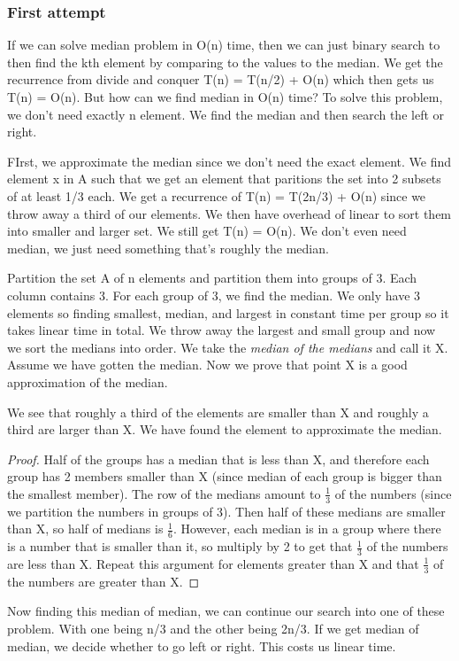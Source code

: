 \documentclass[11pt, oneside]{article}
\theoremstyle{definition}
\begin{document}
\subsubsection{First attempt}
If we can solve median problem in O(n) time, then we can just binary search to then find the kth element by comparing to the values to the median. We get the recurrence from divide and conquer T(n) = T(n/2) + O(n) which then gets us T(n) = O(n). But how can we find median in O(n) time? To solve this problem, we don't need exactly n element. We find the median and then search the left or right.

FIrst, we approximate the median since we don't need the exact element. We find element x in A such that we get an element that paritions the set into 2 subsets of at least 1/3 each. We get a recurrence of T(n) = T(2n/3) + O(n) since we throw away a third of our elements. We then have overhead of linear to sort them into smaller and larger set. We still get T(n) = O(n). We don't even need median, we just need something that's roughly the median.

Partition the set A of n elements and partition them into groups of 3. Each column contains 3. For each group of 3, we find the median. We only have 3 elements so finding smallest, median, and largest in constant time per group so it takes linear time in total. We throw away the largest and small group and now we sort the medians into order. We take the \textit{median of the medians} and call it X. Assume we have gotten the median. Now we prove that point X is a good approximation of the median.

We see that roughly a third of the elements are smaller than X and roughly a third are larger than X. We have found the element to approximate the median.
\begin{proof}
  Half of the groups has a median that is less than X, and therefore each group has 2 members smaller than X (since median of each group is bigger than the smallest member). The row of the medians amount to $\frac{1}{3}$ of the numbers (since we partition the numbers in groups of 3). Then half of these medians are smaller than X, so half of medians is $\frac{1}{6}$. However, each median is in a group where there is a number that is smaller than it, so multiply by 2 to get that $\frac{1}{3}$ of the numbers are less than X. Repeat this argument for elements greater than X and that $\frac{1}{3}$ of the numbers are greater than X.
\end{proof}

Now finding this median of median, we can continue our search into one of these problem. With one being n/3 and the other being 2n/3. If we get median of median, we decide whether to go left or right. This costs us linear time.
\end{document}
